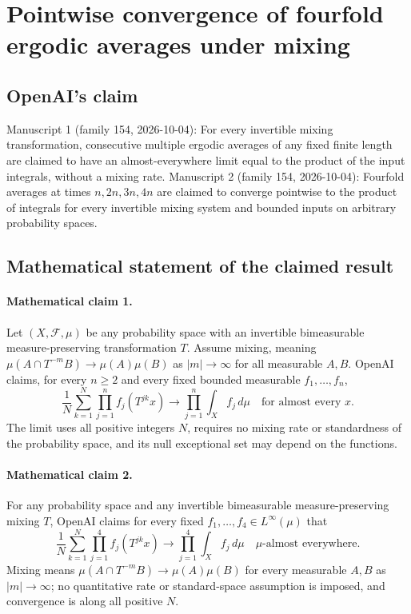 \documentclass[11pt]{article}
\begin{document}
\section*{Pointwise convergence of fourfold ergodic averages under mixing}

\subsection{OpenAI's claim}
Manuscript 1 (family 154, 2026-10-04): For every invertible mixing transformation, consecutive multiple ergodic averages of any fixed finite length are claimed to have an almost-everywhere limit equal to the product of the input integrals, without a mixing rate. Manuscript 2 (family 154, 2026-10-04): Fourfold averages at times $n,2n,3n,4n$ are claimed to converge pointwise to the product of integrals for every invertible mixing system and bounded inputs on arbitrary probability spaces.

\subsection{Mathematical statement of the claimed result}
\paragraph{Mathematical claim 1.} Let $(X,\mathcal F,\mu)$ be any probability space with an invertible bimeasurable measure-preserving transformation $T$. Assume mixing, meaning $\mu(A\cap T^{-m}B)\to\mu(A)\mu(B)$ as $|m|\to\infty$ for all measurable $A,B$. OpenAI claims, for every $n\ge2$ and every fixed bounded measurable $f_1,\ldots,f_n$,
\[
\frac1N\sum_{k=1}^N\prod_{j=1}^n f_j(T^{jk}x)\longrightarrow\prod_{j=1}^n\int_X f_j\,d\mu
\quad\text{for almost every }x.
\]
The limit uses all positive integers $N$, requires no mixing rate or standardness of the probability space, and its null exceptional set may depend on the functions.

\paragraph{Mathematical claim 2.} For any probability space and any invertible bimeasurable measure-preserving mixing $T$, OpenAI claims for every fixed $f_1,\ldots,f_4\in L^\infty(\mu)$ that
\[
\frac1N\sum_{k=1}^N\prod_{j=1}^4 f_j(T^{jk}x)\longrightarrow\prod_{j=1}^4\int_X f_j\,d\mu
\quad\mu\text{-almost everywhere}.
\]
Mixing means $\mu(A\cap T^{-m}B)\to\mu(A)\mu(B)$ for every measurable $A,B$ as $|m|\to\infty$; no quantitative rate or standard-space assumption is imposed, and convergence is along all positive $N$.
\end{document}
